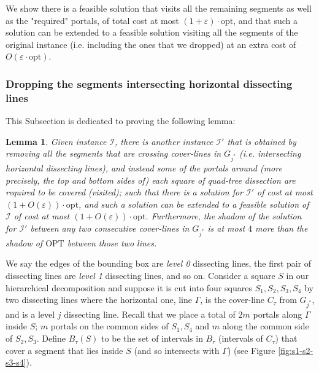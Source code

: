 \documentclass[10pt,a4paper]{amsart}
\theoremstyle{thmstyleone}
\newtheorem{lemma}{Lemma}
\newcommand{\eps}{\varepsilon}
\newcommand{\opt}{{\text{opt}}}
\newcommand{\OPT}{{\text{OPT}}}
\begin{document}
We show there is a feasible solution that visits all the remaining segments as well as the "required" portals, of total cost at most $(1+\eps)\cdot\opt$, and that such a solution can be extended to a feasible solution visiting all the segments of the original instance (i.e. including the ones that we dropped) at an extra cost of $O(\eps\cdot\opt)$.

\subsubsection[Dropping the Segments hitting the Dissecting Lines]{Dropping the segments intersecting horizontal dissecting lines}\label{subsec:dropping-horizontal}

This Subsection is dedicated to proving the following lemma:

\begin{lemma}\label{lemma:horizontal-cover-lines}
    Given instance $\mathcal I$, there is another instance $\mathcal I'$ that is obtained by removing all the segments that are crossing cover-lines in $G_{j^*}$ (i.e. intersecting horizontal dissecting lines),
    and instead some of the portals around (more precisely, the top and bottom sides of) 
    each square of quad-tree dissection are required to be covered (visited); such that there is a solution for 
    $\mathcal I'$ of cost at most $(1+O(\eps))\cdot\opt$, and such a solution can be extended to a feasible solution of $\mathcal I$ of cost at most $(1+O(\eps))\cdot\opt$. Furthermore, the shadow of the solution for $\mathcal I'$
    between any two consecutive cover-lines in $G_{j^*}$ is at most
    $4$ more than the shadow of $\OPT$ between those two lines.
\end{lemma}

We say the edges of the bounding box are {\em level 0} dissecting lines, the first pair of dissecting lines are {\em level 1} dissecting lines, and so on.
Consider a square $S$ in our hierarchical decomposition and suppose
it is cut into four squares $S_1,S_2,S_3,S_4$ by two dissecting lines
where the horizontal one, line $\Gamma$, is the cover-line $C_\tau$ from $G_{j^*}$, 
and is a level $j$ dissecting line.
Recall that we place a total of $2m$ portals 
along $\Gamma$ inside $S$; $m$ portals on the common sides of $S_1,S_4$ and $m$ along the common side of $S_2,S_3$.
Define $B_\tau(S)$ to be the set of intervals in $B_\tau$ (intervals of $C_\tau$)
that cover a segment that lies inside $S$ (and so intersects with $\Gamma$) (see Figure \ref{fig:s1-s2-s3-s4}).
\end{document}
